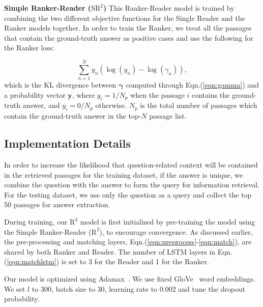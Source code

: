 \documentclass[letterpaper]{article} %
\begin{document}
\noindent \textbf{Simple Ranker-Reader ($\text{SR}^2$)}\quad
This Ranker-Reader model is trained by combining the two different objective functions for the Single Reader and the Ranker models together. In order to train the Ranker, we treat all the passages that contain the ground-truth answer as positive cases and use the following for the Ranker loss:


\begin{equation}
\sum_{n=1}^{N} y_n \left( \log(y_n) - \log(\gamma_n) \right),
\label{eqn:rank_obj_ideal}
\end{equation}
which is the KL divergence between $\mathbf{\gamma}$ computed through Eqn.(\ref{eqn:gamma}) and a probability vector $\mathbf{y}$, where $y_i = {1}/{N_p}$ when the passage $i$ contains the ground-truth answer, and $y_i = {0}/{N_p}$ otherwise.
$N_p$ is the total number of passages which contain the ground-truth answer in the top-$N$ passage list.
\subsection{Implementation Details}
In order to increase the likelihood that question-related context will be contained in the retrieved passages for the training dataset, if the answer is unique, we combine the question with the answer to form the query for
information retrieval. For the testing dataset, we use only the question as a query and collect the top 50 passages for answer extraction.


During training, our $\text{R}^3$ model is first initialized by pre-training the model using the Simple Ranker-Reader ($\text{R}^2$), to encourage convergence.
% 
As discussed earlier, the pre-processing and matching layers, Eqn.(\ref{eqn:preprocess}-\ref{eqn:match}), are shared by both Ranker and Reader. The number of LSTM layers in Eqn.(\ref{eqn:matchlstm}) is set to 3 for the Reader and 1 for the Ranker.

Our model is optimized using Adamax~\cite{kingma2014adam:iclr2015}. We use fixed GloVe~\cite{glove:emnlp2014} 
word embeddings.
We set $l$ to 300, batch size to 30, learning rate to 0.002 and tune the dropout probability.
\end{document}
